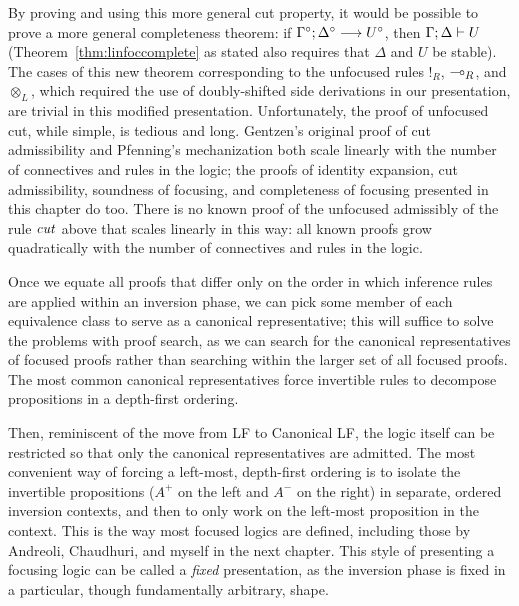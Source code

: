 By proving and using this more general cut property, it would be
possible to prove a more general completeness theorem: if 
${\Gamma^\circ};{\Delta^\circ} \longrightarrow {U^\circ} \mathstrut$, then ${\Gamma};{\Delta} \vdash {U} \mathstrut$
(Theorem~\ref{thm:linfoccomplete} as stated also requires that $\Delta$
and $U$ be stable). The cases of this new 
theorem corresponding to the unfocused rules ${!}_R$,
${\multimap}_R$, and ${\otimes}_L$, which required the use of
doubly-shifted side derivations in our presentation, are trivial in this
modified presentation.  Unfortunately, the proof of unfocused cut,
while simple, is tedious and long. Gentzen's original proof of cut
admissibility \cite{gentzen35untersuchungen} and Pfenning's mechanization
\cite{pfenning00structural} both scale linearly with the number of
connectives and rules in the logic; the proofs of identity expansion, cut
admissibility, soundness of focusing, and completeness of focusing
presented in this chapter do too. There is no known proof of the
unfocused admissibly of the rule ${\it cut}$ above that scales
linearly in this way: all known proofs grow quadratically with the
number of connectives and rules in the logic.

%
Once we equate all proofs that differ only on the order
in which inference rules are applied within an inversion phase, 
we can pick some member of
each equivalence class
to serve as a canonical representative; this will suffice
to solve the problems with proof search, as we can search for 
the canonical representatives of focused proofs rather than searching
within the larger set of all focused proofs. The most common canonical
representatives force invertible rules to decompose propositions 
in a depth-first ordering. 

Then, reminiscent of the move from LF to Canonical LF, the logic
itself can be restricted so that only the canonical representatives
are admitted. The most convenient way of forcing a left-most,
depth-first ordering is to isolate the invertible propositions ($A^+$
on the left and $A^-$ on the right) in separate, ordered inversion
contexts, and then to only work on the left-most proposition in the
context. This is the way most focused logics are defined, including
those by Andreoli, Chaudhuri, and myself in the next chapter. This style of 
presenting a focusing logic can be called a {\it fixed} presentation,
as the inversion phase is fixed in a particular, though
fundamentally arbitrary, shape. 

